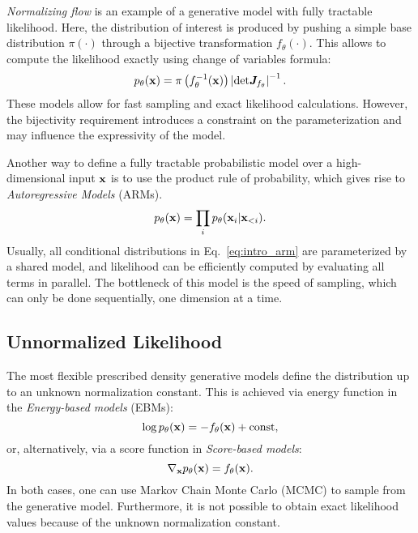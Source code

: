 \textit{Normalizing flow} is an example of a generative model with fully tractable likelihood. Here, the distribution of interest is produced by pushing a simple base distribution $\pi(\cdot)$ through a bijective transformation $f_{\theta}(\cdot)$. This allows to compute the likelihood exactly using change of variables formula:
\begin{equation}\label{eq:intro_nf}
    p_{\theta}(\rvx) = \pi\left(f^{-1}_{\theta}(\rvx)\right) \left|\text{det}\mJ_{f_{\theta}}  \right|^{-1}.
\end{equation}
These models allow for fast sampling and exact likelihood calculations. However, the bijectivity requirement introduces a constraint on the parameterization and may influence the expressivity of the model. 

Another way to define a fully tractable probabilistic model over a high-dimensional input ${\mathbf{x}}$ is to use the product rule of probability, which gives rise to \textit{Autoregressive Models} (ARMs).  
\begin{equation}\label{eq:intro_arm}
    p_{\theta}(\rvx) = \prod_{i}p_{\theta}(\rvx_i | \rvx_{<i}).
\end{equation}
Usually, all conditional distributions in Eq.~\ref{eq:intro_arm} are parameterized by a shared model, and likelihood can be efficiently computed by evaluating all terms in parallel. The bottleneck of this model is the speed of sampling, which can only be done sequentially, one dimension at a time.

\subsection{Unnormalized Likelihood}
The most flexible prescribed density generative models define the distribution up to an unknown normalization constant. 
This is achieved via energy function in the \textit{Energy-based models} (EBMs): 
\begin{equation}
    \log p_{\theta}({\mathbf{x}}) = -f_{\theta}({\mathbf{x}}) + \text{const},
\end{equation}
or, alternatively, via a score function in \textit{Score-based models}:
\begin{equation}\label{eq:intro_score}
    \nabla_{\rvx} p_{\theta}(\rvx) = f_{\theta}(\rvx).
\end{equation}
In both cases, one can use Markov Chain Monte Carlo (MCMC) to sample from the generative model.   Furthermore, it is not possible to obtain exact likelihood values because of the unknown normalization constant. 



